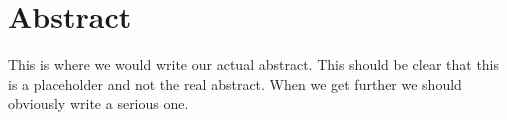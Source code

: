 \setcounter{page}{1}
\section*{Abstract}
This is where we would write our actual abstract. 
This should be clear that this is a placeholder and not the real abstract.
When we get further we should obviously write a serious one. 